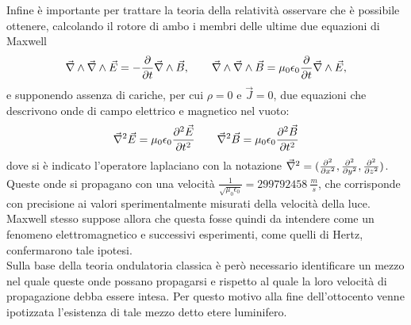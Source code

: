 Infine è importante per trattare la teoria della relatività osservare che è possibile ottenere, calcolando il rotore di ambo 
i membri delle ultime due equazioni di Maxwell
\begin{equation*}
	\vec{\nabla}\wedge\vec{\nabla}\wedge\vec{E}=-\frac{\partial}{\partial t}\vec{\nabla}\wedge\vec{B},
	\qquad \vec{\nabla}\wedge\vec{\nabla}\wedge\vec{B}=\mu_0\epsilon_0\frac{\partial}{\partial t}
	\vec{\nabla}\wedge\vec{E},
\end{equation*}
e supponendo assenza di cariche, per cui $\rho=0$ e $\vec{J}=0$, due equazioni che descrivono 
onde di campo elettrico e magnetico nel vuoto:
\begin{equation}
	\vec{\nabla}^2\vec{E}=\mu_0\epsilon_0\frac{\partial^2\vec{E}}{\partial t^2} \qquad \vec{\nabla}^2\vec{B}=
	\mu_0\epsilon_0\frac{\partial^2\vec{B}}{\partial t^2}
\end{equation}
dove si è indicato l'operatore laplaciano con la notazione $\vec{\nabla}^2=(\frac{\partial^2 }{\partial x^2},\frac{\partial^2 }{\partial y^2},\frac{\partial^2 }{\partial z^2})$.\\
Queste onde si propagano con una velocità $\frac{1}{\sqrt{\mu_0\epsilon_0}}=299792458\  \frac{m}{s}$, 
che corrisponde con precisione ai valori sperimentalmente misurati della velocità della luce.\\ Maxwell stesso suppose allora che questa fosse quindi da intendere come un fenomeno elettromagnetico e successivi esperimenti, come quelli di Hertz, confermarono tale ipotesi.\\
Sulla base della teoria ondulatoria classica è però necessario identificare un mezzo nel quale queste onde possano 
propagarsi e rispetto al quale la loro velocità di propagazione debba essere intesa. Per questo motivo alla fine dell'ottocento venne ipotizzata l'esistenza di tale mezzo detto etere luminifero.